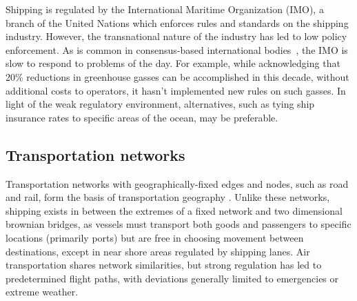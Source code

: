 \documentclass[12pt,letterpaper]{article}
\begin{document}
  Shipping is regulated by the International Maritime Organization (IMO), a branch of the United Nations which enforces rules and standards on the shipping industry. However, the transnational nature of the industry has led to low policy enforcement. As is common in consensus-based international bodies~\citep{cogan2009representation}, the IMO is slow to respond to problems of the day. 
  For example, while acknowledging that 20\% reductions in greenhouse gasses can be accomplished in this decade, without additional costs to operators\citep{imo2009}, it hasn't implemented new rules on such gasses.  In light of the weak regulatory environment, alternatives, such as tying ship insurance rates to specific areas of the ocean, may be preferable.



\subsection{Transportation networks}

Transportation networks with geographically-fixed edges and nodes, such as road and rail, form the basis of transportation geography \citep{Rodrigue2009}. Unlike these networks, shipping exists in between the extremes of a fixed network %
 and two dimensional brownian bridges, %
  as vessels must transport both goods and passengers to specific locations (primarily ports) but are free in choosing movement between destinations, except in near shore areas regulated by shipping lanes. Air transportation shares network similarities, but strong regulation has led to predetermined flight paths, with deviations generally limited to emergencies or extreme weather. %
\end{document}
